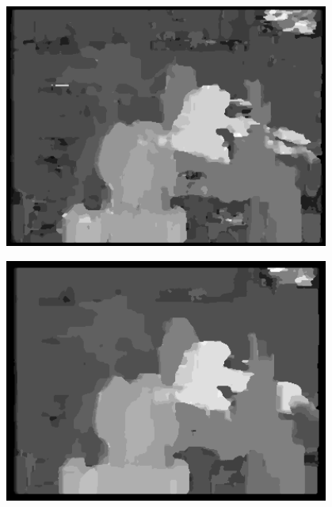 \documentclass[a4paper]{scrartcl}
\begin{document}
\vspace{1cm}
\begin{minipage}{0.8\textwidth}
  \centering
  \includegraphics[width=0.8\textwidth]{disparity-r4-ssd-d20-m1.png}
  \label{fig:disparity-r4-ssd-d20-m1}
\end{minipage}

\vspace{1cm}
\begin{minipage}{0.8\textwidth}
  \centering
  \includegraphics[width=0.8\textwidth]{disparity-r8-ssd-d20-m1.png}
  \label{fig:disparity-r8-ssd-d20-m1}
\end{minipage}
\end{document}
